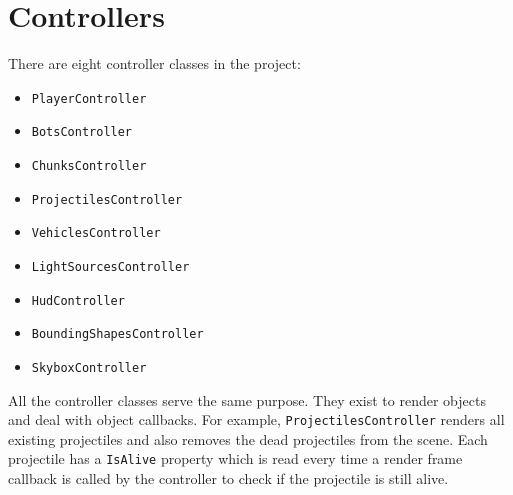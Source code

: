 \section{Controllers}

There are eight controller classes in the project:

\begin{itemize}
    \item  \texttt{PlayerController}
    \item \texttt{BotsController}
    \item \texttt{ChunksController}
    \item \texttt{ProjectilesController}
    \item \texttt{VehiclesController}
    \item \texttt{LightSourcesController}
    \item \texttt{HudController}
    \item \texttt{BoundingShapesController}
    \item \texttt{SkyboxController}
\end{itemize}

All the controller classes serve the same purpose.
They exist to render objects and deal with object callbacks.
For example, \texttt{ProjectilesController} renders all existing projectiles and also removes the dead projectiles from the scene.
Each projectile has a \texttt{IsAlive} property which is read every time a render frame callback is called by the controller to check if the projectile is still alive.
